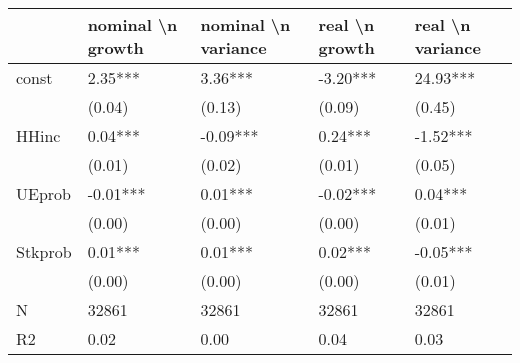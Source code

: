 \documentclass{report}
\begin{document}
\begin{table}\begin{tabular}{lllll}
\toprule
{} & nominal \textbackslash n growth & nominal \textbackslash n variance & real \textbackslash n growth & real \textbackslash n variance \\
\midrule
const   &           2.35*** &             3.36*** &       -3.20*** &         24.93*** \\
        &            (0.04) &              (0.13) &         (0.09) &           (0.45) \\
HHinc   &           0.04*** &            -0.09*** &        0.24*** &         -1.52*** \\
        &            (0.01) &              (0.02) &         (0.01) &           (0.05) \\
UEprob  &          -0.01*** &             0.01*** &       -0.02*** &          0.04*** \\
        &            (0.00) &              (0.00) &         (0.00) &           (0.01) \\
Stkprob &           0.01*** &             0.01*** &        0.02*** &         -0.05*** \\
        &            (0.00) &              (0.00) &         (0.00) &           (0.01) \\
N       &             32861 &               32861 &          32861 &            32861 \\
R2      &              0.02 &                0.00 &           0.04 &             0.03 \\
\bottomrule
\end{tabular}
\end{table}
\end{document}
